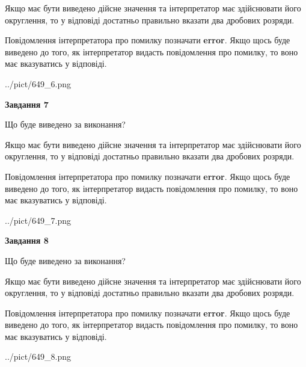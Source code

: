 \documentclass[12pt, ukrainian]{article}
\begin{document}
{\begin {Large}
Якщо має бути виведено дійсне значення та інтерпретатор має здійснювати його округлення, 
то у відповіді достатньо правильно вказати два дробових розряди.

Повідомлення інтерпретатора про помилку позначати \textbf{error}.
Якщо щось буде виведено до того, як інтерпретатор видасть повідомлення про помилку, 
то воно має вказуватись у відповіді. \par

\begin{center}
	{../pict/649_6.png}
\end{center}
\newpage

{\begin {center}\textbf{Завдання 7}\end {center}}\par
Що буде виведено за виконання? \par

Якщо має бути виведено дійсне значення та інтерпретатор має здійснювати його округлення, 
то у відповіді достатньо правильно вказати два дробових розряди.

Повідомлення інтерпретатора про помилку позначати \textbf{error}.
Якщо щось буде виведено до того, як інтерпретатор видасть повідомлення про помилку, 
то воно має вказуватись у відповіді. \par

\begin{center}
	{../pict/649_7.png}
\end{center}
\newpage

{\begin {center}\textbf{Завдання 8}\end {center}}\par
Що буде виведено за виконання? \par

Якщо має бути виведено дійсне значення та інтерпретатор має здійснювати його округлення, 
то у відповіді достатньо правильно вказати два дробових розряди.

Повідомлення інтерпретатора про помилку позначати \textbf{error}.
Якщо щось буде виведено до того, як інтерпретатор видасть повідомлення про помилку, 
то воно має вказуватись у відповіді. \par

\begin{center}
	{../pict/649_8.png}
\end{center}
\newpage


\end{Large}}
\end{document}
